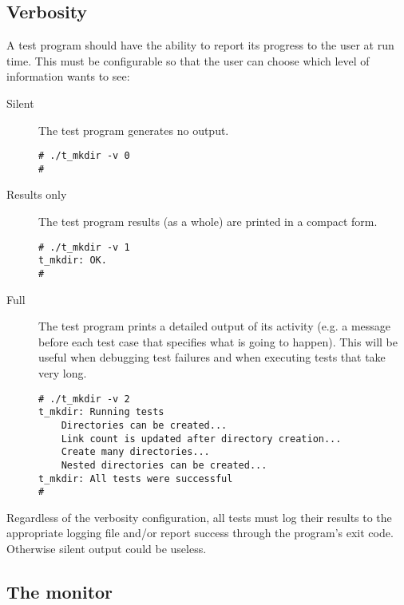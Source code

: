 \documentclass[a4paper,10pt]{article}
\begin{document}

\subsection{Verbosity}

A test program should have the ability to report its progress to the user
at run time.  This must be configurable so that the user can choose which
level of information wants to see:

\begin{description}

\item [Silent]
The test program generates no output.

\begin{verbatim}
# ./t_mkdir -v 0
#
\end{verbatim}

\item [Results only]
The test program results (as a whole) are printed in a compact form.

\begin{verbatim}
# ./t_mkdir -v 1
t_mkdir: OK.
#
\end{verbatim}

\item [Full]
The test program prints a detailed output of its activity (e.g. a message
before each test case that specifies what is going to happen).  This 
will be useful when debugging test failures and when executing tests that
take very long.

\begin{verbatim}
# ./t_mkdir -v 2
t_mkdir: Running tests
    Directories can be created...
    Link count is updated after directory creation...
    Create many directories...
    Nested directories can be created...
t_mkdir: All tests were successful
#
\end{verbatim}

\end{description}

Regardless of the verbosity configuration, all tests must log their results
to the appropriate logging file and/or report success through the program's
exit code.  Otherwise silent output could be useless.


\subsection{The monitor}
\label{sec:monitor}
\end{document}
